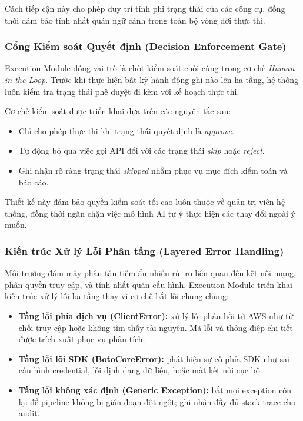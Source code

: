 Cách tiếp cận này cho phép duy trì tính phi trạng thái của các công cụ, đồng thời đảm bảo tính nhất quán ngữ cảnh trong toàn bộ vòng đời thực thi.

\subsubsection*{Cổng Kiểm soát Quyết định (Decision Enforcement Gate)}

Execution Module
đóng vai trò
là chốt kiểm soát cuối cùng
trong cơ chế
\textit{Human-in-the-Loop}.
Trước khi thực hiện
bất kỳ hành động ghi nào
lên hạ tầng,
hệ thống luôn kiểm tra
trạng thái phê duyệt
đi kèm với kế hoạch thực thi.

Cơ chế kiểm soát được triển khai dựa trên các nguyên tắc sau:
\begin{itemize}
  \item Chỉ cho phép thực thi khi trạng thái quyết định là \textit{approve}.
  \item Tự động bỏ qua việc gọi API đối với các trạng thái \textit{skip} hoặc \textit{reject}.
  \item Ghi nhận rõ ràng trạng thái \textit{skipped} nhằm phục vụ mục đích kiểm toán và báo cáo.
\end{itemize}

Thiết kế này đảm bảo quyền kiểm soát tối cao luôn thuộc về quản trị viên hệ thống, đồng thời ngăn chặn việc mô hình AI tự ý thực hiện các thay đổi ngoài ý muốn.

\subsubsection*{Kiến trúc Xử lý Lỗi Phân tầng (Layered Error Handling)}

Môi trường đám mây phân tán tiềm ẩn nhiều rủi ro liên quan đến kết nối mạng, phân quyền truy cập, và tính nhất quán cấu hình. Execution Module triển khai kiến trúc xử lý lỗi ba tầng thay vì cơ chế bắt lỗi chung chung:

\begin{itemize}
  \item \textbf{Tầng lỗi phía dịch vụ (ClientError):} xử lý lỗi phản hồi từ AWS như từ chối truy cập hoặc không tìm thấy tài nguyên. Mã lỗi và thông điệp chi tiết được trích xuất phục vụ phân tích.
  \item \textbf{Tầng lỗi lõi SDK (BotoCoreError):} phát hiện sự cố phía SDK như sai cấu hình credential, lỗi định dạng dữ liệu, hoặc mất kết nối cục bộ.
  \item \textbf{Tầng lỗi không xác định (Generic Exception):} bắt mọi exception còn lại để pipeline không bị gián đoạn đột ngột; ghi nhận đầy đủ stack trace cho audit.
\end{itemize}


